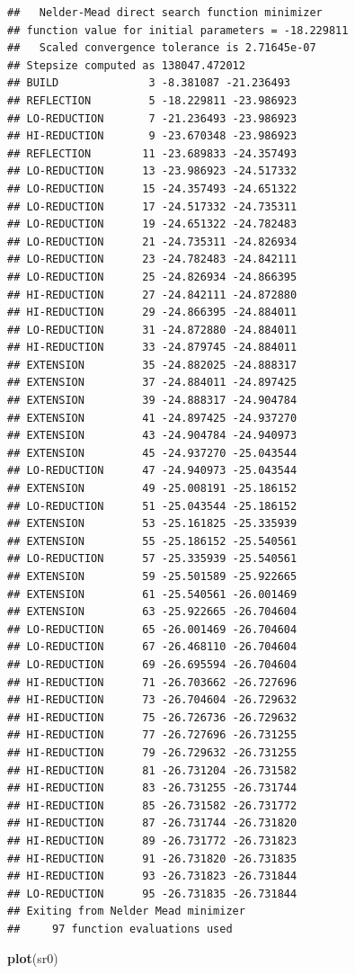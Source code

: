 \documentclass[
]{book}
\newenvironment{Shaded}{\begin{snugshade}}{\end{snugshade}}
\newcommand{\FunctionTok}[1]{\textcolor[rgb]{0.13,0.29,0.53}{\textbf{#1}}}
\newcommand{\NormalTok}[1]{#1}
\begin{document}
\begin{verbatim}
##   Nelder-Mead direct search function minimizer
## function value for initial parameters = -18.229811
##   Scaled convergence tolerance is 2.71645e-07
## Stepsize computed as 138047.472012
## BUILD              3 -8.381087 -21.236493
## REFLECTION         5 -18.229811 -23.986923
## LO-REDUCTION       7 -21.236493 -23.986923
## HI-REDUCTION       9 -23.670348 -23.986923
## REFLECTION        11 -23.689833 -24.357493
## LO-REDUCTION      13 -23.986923 -24.517332
## LO-REDUCTION      15 -24.357493 -24.651322
## LO-REDUCTION      17 -24.517332 -24.735311
## LO-REDUCTION      19 -24.651322 -24.782483
## LO-REDUCTION      21 -24.735311 -24.826934
## LO-REDUCTION      23 -24.782483 -24.842111
## LO-REDUCTION      25 -24.826934 -24.866395
## HI-REDUCTION      27 -24.842111 -24.872880
## HI-REDUCTION      29 -24.866395 -24.884011
## LO-REDUCTION      31 -24.872880 -24.884011
## HI-REDUCTION      33 -24.879745 -24.884011
## EXTENSION         35 -24.882025 -24.888317
## EXTENSION         37 -24.884011 -24.897425
## EXTENSION         39 -24.888317 -24.904784
## EXTENSION         41 -24.897425 -24.937270
## EXTENSION         43 -24.904784 -24.940973
## EXTENSION         45 -24.937270 -25.043544
## LO-REDUCTION      47 -24.940973 -25.043544
## EXTENSION         49 -25.008191 -25.186152
## LO-REDUCTION      51 -25.043544 -25.186152
## EXTENSION         53 -25.161825 -25.335939
## EXTENSION         55 -25.186152 -25.540561
## LO-REDUCTION      57 -25.335939 -25.540561
## EXTENSION         59 -25.501589 -25.922665
## EXTENSION         61 -25.540561 -26.001469
## EXTENSION         63 -25.922665 -26.704604
## LO-REDUCTION      65 -26.001469 -26.704604
## LO-REDUCTION      67 -26.468110 -26.704604
## LO-REDUCTION      69 -26.695594 -26.704604
## HI-REDUCTION      71 -26.703662 -26.727696
## HI-REDUCTION      73 -26.704604 -26.729632
## HI-REDUCTION      75 -26.726736 -26.729632
## HI-REDUCTION      77 -26.727696 -26.731255
## HI-REDUCTION      79 -26.729632 -26.731255
## HI-REDUCTION      81 -26.731204 -26.731582
## HI-REDUCTION      83 -26.731255 -26.731744
## HI-REDUCTION      85 -26.731582 -26.731772
## HI-REDUCTION      87 -26.731744 -26.731820
## HI-REDUCTION      89 -26.731772 -26.731823
## HI-REDUCTION      91 -26.731820 -26.731835
## HI-REDUCTION      93 -26.731823 -26.731844
## LO-REDUCTION      95 -26.731835 -26.731844
## Exiting from Nelder Mead minimizer
##     97 function evaluations used
\end{verbatim}

\begin{Shaded}
\begin{Highlighting}[]
\FunctionTok{plot}\NormalTok{(sr0)}
\end{Highlighting}
\end{Shaded}
\end{document}
